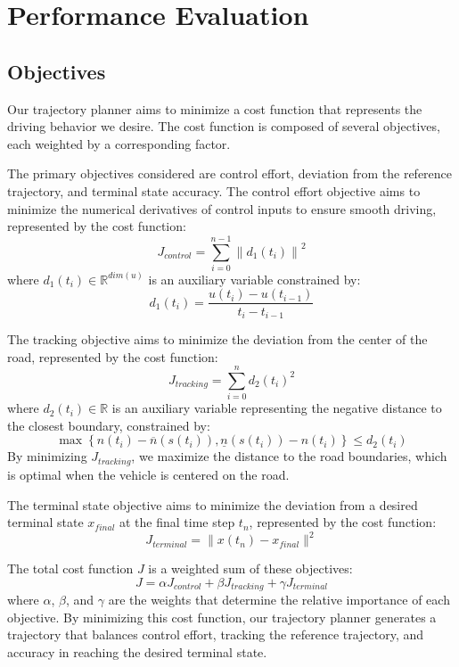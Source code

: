 \section{Performance Evaluation} \label{sec:performance-evaluation}

\subsection{Objectives} \label{subsec:objectives}

Our trajectory planner aims to minimize a cost function that represents the driving behavior we desire.
The cost function is composed of several objectives, each weighted by a corresponding factor.

The primary objectives considered are control effort, deviation from the reference trajectory, and terminal state accuracy.
The control effort objective aims to minimize
the numerical derivatives of control inputs to ensure smooth driving, represented by the cost function:
\begin{equation}
	J_{control} = \sum_{i=0}^{n-1} \left\| d_1(t_i) \right\|^2
\end{equation}
where $d_1(t_i)\in \mathbb{R}^{dim(u)}$ is an auxiliary variable constrained by: \[
	d_1(t_i) = \frac{u(t_i) - u(t_{i-1})}{t_i - t_{i-1}}
\]

The tracking objective aims to minimize the deviation from the center of the road, represented by the cost function:
\begin{equation}
	J_{tracking} = \sum_{i=0}^{n} d_2(t_i)^2 \end{equation} where $d_2(t_i)\in \mathbb{R}$ is an auxiliary variable representing the negative distance to
the closest boundary, constrained by: \[ \max \left\{ n(t_i)-\overline{n}(s(t_i)), \underline{n}(s(t_i)) - n(t_i) \right\} \leq d_2(t_i)\] By
minimizing $J_{tracking}$, we maximize the distance to the road boundaries, which is optimal when the vehicle is centered on the road.

The terminal state objective aims to minimize the deviation from a desired terminal state $x_{final}$ at the final time step $t_n$, represented by the cost function:
\begin{equation}
	J_{terminal} = \|x(t_n) - x_{final}\|^2
\end{equation}

The total cost function $J$ is a weighted sum of these objectives:
\begin{equation}
	J = \alpha J_{control} + \beta J_{tracking} + \gamma J_{terminal} \label{eq:cost_function_combined} \end{equation} where $\alpha$, $\beta$, and
$\gamma$ are the weights that determine the relative importance of each objective.
By minimizing this cost function, our trajectory planner generates a trajectory that balances control effort, tracking the reference trajectory, and
accuracy in reaching the desired terminal state.

